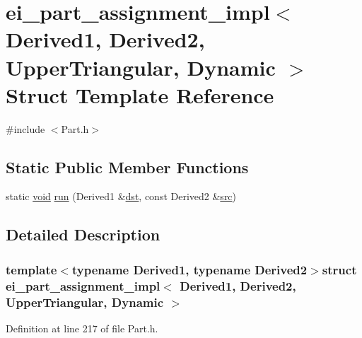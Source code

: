 \hypertarget{structei__part__assignment__impl_3_01_derived1_00_01_derived2_00_01_upper_triangular_00_01_dynamic_01_4}{\section{ei\-\_\-part\-\_\-assignment\-\_\-impl$<$ Derived1, Derived2, Upper\-Triangular, Dynamic $>$ Struct Template Reference}
\label{structei__part__assignment__impl_3_01_derived1_00_01_derived2_00_01_upper_triangular_00_01_dynamic_01_4}
}


{\ttfamily \#include $<$Part.\-h$>$}

\subsection*{Static Public Member Functions}
\begin{DoxyCompactItemize}
\item 
static \hyperlink{group___u_a_v_objects_plugin_ga444cf2ff3f0ecbe028adce838d373f5c}{void} \hyperlink{structei__part__assignment__impl_3_01_derived1_00_01_derived2_00_01_upper_triangular_00_01_dynamic_01_4_a3c703f5fc42611d96a1067b1b1d3f78b}{run} (Derived1 \&\hyperlink{glext_8h_a92034251bfd455d524a9b5610cddba00}{dst}, const Derived2 \&\hyperlink{glext_8h_a72e0fdf0f845ded60b1fada9e9195cd7}{src})
\end{DoxyCompactItemize}


\subsection{Detailed Description}
\subsubsection*{template$<$typename Derived1, typename Derived2$>$struct ei\-\_\-part\-\_\-assignment\-\_\-impl$<$ Derived1, Derived2, Upper\-Triangular, Dynamic $>$}



Definition at line 217 of file Part.\-h.



